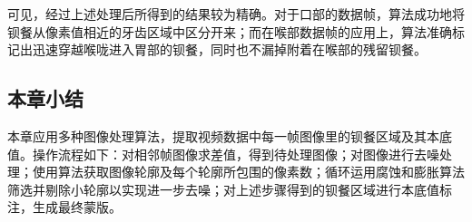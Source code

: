 可见，经过上述处理后所得到的结果较为精确。对于口部的数据帧，算法成功地将钡餐从像素值相近的牙齿区域中区分开来；而在喉部数据帧的应用上，算法准确标记出迅速穿越喉咙进入胃部的钡餐，同时也不漏掉附着在喉部的残留钡餐。

\subsection{本章小结}

本章应用多种图像处理算法，提取视频数据中每一帧图像里的钡餐区域及其本底值。操作流程如下：对相邻帧图像求差值，得到待处理图像；对图像进行去噪处理；使用算法获取图像轮廓及每个轮廓所包围的像素数；循环运用腐蚀和膨胀算法筛选并剔除小轮廓以实现进一步去噪；对上述步骤得到的钡餐区域进行本底值标注，生成最终蒙版。